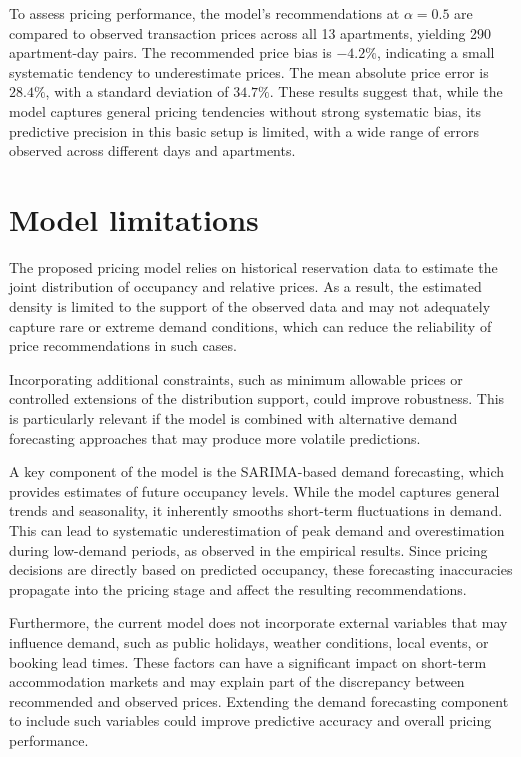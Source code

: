 To assess pricing performance, the model's recommendations at $\alpha=0.5$ are compared to observed transaction prices across all 13 apartments, yielding 290 apartment-day pairs. The recommended price bias is $-4.2\%$, indicating a small systematic tendency to underestimate prices. The mean absolute price error is $28.4\%$, with a standard deviation of $34.7\%$. These results suggest that, while the model captures general pricing tendencies without strong systematic bias, its predictive precision in this basic setup is limited, with a wide range of errors observed across different days and apartments.


\section{Model limitations}
\label{sec:limitations}
The proposed pricing model relies on historical reservation data to estimate the joint distribution of occupancy and relative prices. As a result, the estimated density is limited to the support of the observed data and may not adequately capture rare or extreme demand conditions, which can reduce the reliability of price recommendations in such cases.

Incorporating additional constraints, such as minimum allowable prices or controlled extensions of the distribution support, could improve robustness. This is particularly relevant if the model is combined with alternative demand forecasting approaches that may produce more volatile predictions.

A key component of the model is the SARIMA-based demand forecasting, which provides estimates of future occupancy levels. While the model captures general trends and seasonality, it inherently smooths short-term fluctuations in demand. This can lead to systematic underestimation of peak demand and overestimation during low-demand periods, as observed in the empirical results. Since pricing decisions are directly based on predicted occupancy, these forecasting inaccuracies propagate into the pricing stage and affect the resulting recommendations.

Furthermore, the current model does not incorporate external variables that may influence demand, such as public holidays, weather conditions, local events, or booking lead times. These factors can have a significant impact on short-term accommodation markets and may explain part of the discrepancy between recommended and observed prices. Extending the demand forecasting component to include such variables could improve predictive accuracy and overall pricing performance.

